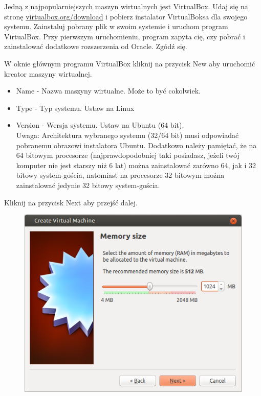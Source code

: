 Jedną z najpopularniejszych maszyn wirtualnych jest VirtualBox. Udaj się na stronę \href{https://www.virtualbox.org/wiki/Downloads}{virtualbox.org/download} i pobierz instalator VirtualBoksa dla swojego systemu. Zainstaluj pobrany plik w swoim systemie i uruchom program VirtualBox. Przy pierwszym uruchomieniu, program zapyta cię, czy pobrać i zainstalować dodatkowe rozszerzenia od Oracle. Zgódź się.

W oknie głównym programu VirtualBox kliknij na przycisk \textcolor{ubuntu_orange}{New} aby uruchomić kreator maszyny wirtualnej.


\begin{itemize}
\item \textcolor{ubuntu_orange}{Name} - Nazwa maszyny wirtualne. Może to być cokolwiek.
\item \textcolor{ubuntu_orange}{Type} - Typ systemu. Ustaw na \textcolor{ubuntu_orange}{Linux}
\item \textcolor{ubuntu_orange}{Version} - Wersja systemu. Ustaw na \textcolor{ubuntu_orange}{Ubuntu (64 bit)}.\\
Uwaga: Architektura wybranego systemu (32/64 bit) musi odpowiadać pobranemu obrazowi instalatora Ubuntu. Dodatkowo należy pamiętać, że na 64 bitowym procesorze (najprawdopodobniej taki posiadasz, jeżeli twój komputer nie jest starszy niż 6 lat) można zainstalować zarówno 64, jak i 32 bitowy system-gościa, natomiast na procesorze 32 bitowym można zainstalować jedynie 32 bitowy system-gościa.
\end{itemize}
\begin{flushright}
Kliknij na przycisk \textcolor{ubuntu_orange}{Next} aby przejść dalej.
\end{flushright}

\clearpage
\begin{figure}
	\vspace{-10pt}
	\includegraphics[width=\linewidth]{images/virtualbox_wizard2.png}
\end{figure}

